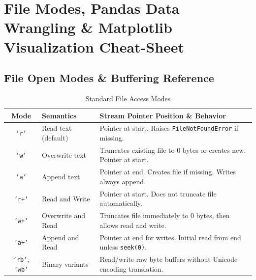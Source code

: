 \chapter{File Modes, Pandas Data Wrangling \& Matplotlib Visualization Cheat-Sheet}
\label{chap:files-pandas-matplotlib}

\section{File Open Modes \& Buffering Reference}
\begin{table}[htbp]
\centering
\small
\begin{tabularx}{\linewidth}{clX}
\toprule
\textbf{Mode} & \textbf{Semantics} & \textbf{Stream Pointer Position \& Behavior} \\
\midrule
\texttt{'r'} & Read text (default) & Pointer at start. Raises \texttt{FileNotFoundError} if missing. \\
\texttt{'w'} & Overwrite text & Truncates existing file to 0 bytes or creates new. Pointer at start. \\
\texttt{'a'} & Append text & Pointer at end. Creates file if missing. Writes always append. \\
\texttt{'r+'} & Read and Write & Pointer at start. Does not truncate file automatically. \\
\texttt{'w+'} & Overwrite and Read & Truncates file immediately to 0 bytes, then allows read and write. \\
\texttt{'a+'} & Append and Read & Pointer at end for writes. Initial read from end unless \texttt{seek(0)}. \\
\texttt{'rb'}, \texttt{'wb'} & Binary variants & Read/write raw byte buffers without Unicode encoding translation. \\
\bottomrule
\end{tabularx}
\caption{Standard File Access Modes}
\end{table}

